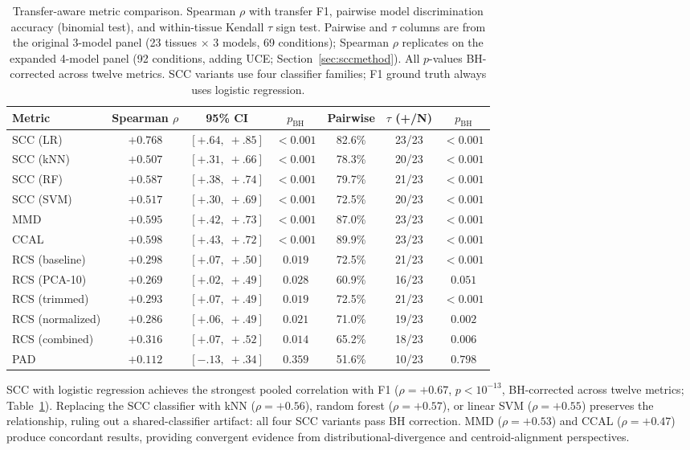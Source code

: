\documentclass[11pt]{article}
\begin{document}
\medskip
\begin{table}[t]
\centering
\caption{Transfer-aware metric comparison. Spearman $\rho$ with
transfer F1, pairwise model discrimination accuracy (binomial test),
and within-tissue Kendall $\tau$ sign test. Pairwise and $\tau$
columns are from the original 3-model panel (23 tissues $\times$ 3
models, 69 conditions); Spearman $\rho$ replicates on the expanded
4-model panel (92 conditions, adding UCE;
Section~\ref{sec:sccmethod}). All $p$-values BH-corrected across
twelve metrics. SCC variants use four classifier families; F1 ground
truth always uses logistic regression.}
\label{tab:scc}
\small
\begin{tabular}{@{}lcccccc@{}}
\toprule
Metric & Spearman $\rho$ & 95\% CI & $p_{\text{BH}}$ & Pairwise & $\tau$ (+/N) & $p_{\text{BH}}$ \\
\midrule
SCC (LR)         & $+0.768$ & $[+.64,\;+.85]$ & $<0.001$ & 82.6\% & 23/23 & $<0.001$ \\
SCC (kNN)        & $+0.507$ & $[+.31,\;+.66]$ & $<0.001$ & 78.3\% & 20/23 & $<0.001$ \\
SCC (RF)         & $+0.587$ & $[+.38,\;+.74]$ & $<0.001$ & 79.7\% & 21/23 & $<0.001$ \\
SCC (SVM)        & $+0.517$ & $[+.30,\;+.69]$ & $<0.001$ & 72.5\% & 20/23 & $<0.001$ \\
\midrule
MMD              & $+0.595$ & $[+.42,\;+.73]$ & $<0.001$ & 87.0\% & 23/23 & $<0.001$ \\
CCAL             & $+0.598$ & $[+.43,\;+.72]$ & $<0.001$ & 89.9\% & 23/23 & $<0.001$ \\
\midrule
RCS (baseline)   & $+0.298$ & $[+.07,\;+.50]$ & $0.019$  & 72.5\% & 21/23 & $<0.001$ \\
RCS (PCA-10)     & $+0.269$ & $[+.02,\;+.49]$ & $0.028$  & 60.9\% & 16/23 & $0.051$ \\
RCS (trimmed)    & $+0.293$ & $[+.07,\;+.49]$ & $0.019$  & 72.5\% & 21/23 & $<0.001$ \\
RCS (normalized) & $+0.286$ & $[+.06,\;+.49]$ & $0.021$  & 71.0\% & 19/23 & $0.002$ \\
RCS (combined)   & $+0.316$ & $[+.07,\;+.52]$ & $0.014$  & 65.2\% & 18/23 & $0.006$ \\
\midrule
PAD              & $+0.112$ & $[-.13,\;+.34]$ & $0.359$  & 51.6\% & 10/23 & $0.798$ \\
\bottomrule
\end{tabular}
\end{table}

SCC with logistic regression achieves the strongest pooled correlation
with F1 ($\rho = +0.67$, $p < 10^{-13}$, BH-corrected across twelve
metrics; Table~\ref{tab:scc}). Replacing the SCC classifier with
kNN ($\rho = +0.56$), random forest ($\rho = +0.57$), or linear SVM
($\rho = +0.55$) preserves the relationship, ruling out a shared-classifier
artifact: all four SCC variants pass BH correction.
MMD ($\rho = +0.53$) and CCAL ($\rho = +0.47$) produce concordant
results, providing convergent evidence from distributional-divergence
and centroid-alignment perspectives.
\end{document}
